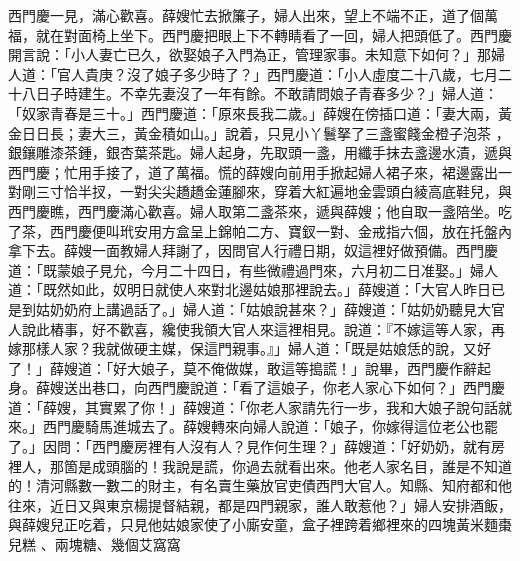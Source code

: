 \begin{showcontents}{}
西門慶一見，滿心歡喜。薛嫂忙去掀簾子，婦人出來，望上不端不正，道了個萬福，就在對面椅上坐下。西門慶把眼上下不轉睛看了一回，婦人把頭低了。西門慶開言說：「小人妻亡已久，欲娶娘子入門為正，管理家事。未知意下如何？」那婦人道：「官人貴庚？沒了娘子多少時了？」西門慶道：「小人虛度二十八歲，七月二十八日子時建生。不幸先妻沒了一年有餘。不敢請問娘子青春多少？」婦人道：「奴家青春是三十。」西門慶道：「原來長我二歲。」薛嫂在傍插口道：「妻大兩，黃金日日長；妻大三，黃金積如山。」說着，只見小丫鬟拏了三盞蜜餞金橙子泡茶 ，銀鑲雕漆茶鍾，銀杏葉茶匙。婦人起身，先取頭一盞，用纖手抹去盞邊水漬，遞與西門慶；忙用手接了，道了萬福。慌的薛嫂向前用手掀起婦人裙子來，裙邊露出一對剛三寸恰半扠，一對尖尖趫趫金蓮腳來，穿着大紅遍地金雲頭白綾高底鞋兒，與西門慶瞧，西門慶滿心歡喜。婦人取第二盞茶來，遞與薛嫂；他自取一盞陪坐。吃了茶，西門慶便叫玳安用方盒呈上錦帕二方、寶釵一對、金戒指六個，放在托盤內拿下去。薛嫂一面教婦人拜謝了，因問官人行禮日期，奴這裡好做預備。西門慶道：「既蒙娘子見允，今月二十四日，有些微禮過門來，六月初二日准娶。」婦人道：「既然如此，奴明日就使人來對北邊姑娘那裡說去。」薛嫂道：「大官人昨日已是到姑奶奶府上講過話了。」婦人道：「姑娘說甚來？」薛嫂道：「姑奶奶聽見大官人說此樁事，好不歡喜，纔使我領大官人來這裡相見。說道：『不嫁這等人家，再嫁那樣人家？我就做硬主媒，保這門親事。』」婦人道：「既是姑娘恁的說，又好了！」薛嫂道：「好大娘子，莫不俺做媒，敢這等搗謊！」說畢，西門慶作辭起身。薛嫂送出巷口，向西門慶說道：「看了這娘子，你老人家心下如何？」西門慶道：「薛嫂，其實累了你！」薛嫂道：「你老人家請先行一步，我和大娘子說句話就來。」西門慶騎馬進城去了。薛嫂轉來向婦人說道：「娘子，你嫁得這位老公也罷了。」因問：「西門慶房裡有人沒有人？見作何生理？」薛嫂道：「好奶奶，就有房裡人，那箇是成頭腦的！我說是謊，你過去就看出來。他老人家名目，誰是不知道的！清河縣數一數二的財主，有名賣生藥放官吏債西門大官人。知縣、知府都和他往來，近日又與東京楊提督結親，都是四門親家，誰人敢惹他？」婦人安排酒飯，與薛嫂兒正吃着，只見他姑娘家使了小廝安童，盒子裡跨着鄉裡來的四塊黃米麵棗兒糕 、兩塊糖、幾個艾窩窩 
\end{showcontents}
